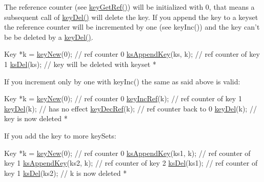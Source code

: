 The reference counter (see \hyperlink{group__key_ga4aabc4272506dd63161db2bbb42de8ae}{key\-Get\-Ref()}) will be initialized with 0, that means a subsequent call of \hyperlink{group__key_ga3df95bbc2494e3e6703ece5639be5bb1}{key\-Del()} will delete the key. If you append the key to a keyset the reference counter will be incremented by one (see key\-Inc()) and the key can't be be deleted by a \hyperlink{group__key_ga3df95bbc2494e3e6703ece5639be5bb1}{key\-Del()}.


\begin{DoxyCode}
Key *k = \hyperlink{group__key_gaf6893c038b3ebee90c73a9ea8356bebf}{keyNew}(0); \textcolor{comment}{// ref counter 0}
\hyperlink{group__keyset_gaa5a1d467a4d71041edce68ea7748ce45}{ksAppendKey}(ks, k); \textcolor{comment}{// ref counter of key 1}
\hyperlink{group__keyset_ga27e5c16473b02a422238c8d970db7ac8}{ksDel}(ks); \textcolor{comment}{// key will be deleted with keyset}
 *
\end{DoxyCode}


If you increment only by one with key\-Inc() the same as said above is valid\-:


\begin{DoxyCode}
Key *k = \hyperlink{group__key_gaf6893c038b3ebee90c73a9ea8356bebf}{keyNew}(0); \textcolor{comment}{// ref counter 0}
\hyperlink{group__key_ga6970a6f254d67af7e39f8e469bb162f1}{keyIncRef}(k); \textcolor{comment}{// ref counter of key 1}
\hyperlink{group__key_ga3df95bbc2494e3e6703ece5639be5bb1}{keyDel}(k);    \textcolor{comment}{// has no effect}
\hyperlink{group__key_ga2c6433ca22109e4e141946057eccb283}{keyDecRef}(k); \textcolor{comment}{// ref counter back to 0}
\hyperlink{group__key_ga3df95bbc2494e3e6703ece5639be5bb1}{keyDel}(k);    \textcolor{comment}{// key is now deleted}
 *
\end{DoxyCode}


If you add the key to more key\-Sets\-:


\begin{DoxyCode}
Key *k = \hyperlink{group__key_gaf6893c038b3ebee90c73a9ea8356bebf}{keyNew}(0); \textcolor{comment}{// ref counter 0}
\hyperlink{group__keyset_gaa5a1d467a4d71041edce68ea7748ce45}{ksAppendKey}(ks1, k); \textcolor{comment}{// ref counter of key 1}
\hyperlink{group__keyset_gaa5a1d467a4d71041edce68ea7748ce45}{ksAppendKey}(ks2, k); \textcolor{comment}{// ref counter of key 2}
\hyperlink{group__keyset_ga27e5c16473b02a422238c8d970db7ac8}{ksDel}(ks1); \textcolor{comment}{// ref counter of key 1}
\hyperlink{group__keyset_ga27e5c16473b02a422238c8d970db7ac8}{ksDel}(ks2); \textcolor{comment}{// k is now deleted}
 *
\end{DoxyCode}


